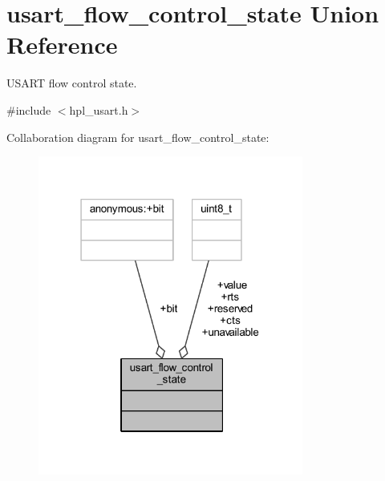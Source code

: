 \hypertarget{unionusart__flow__control__state}{}\section{usart\+\_\+flow\+\_\+control\+\_\+state Union Reference}
\label{unionusart__flow__control__state}


U\+S\+A\+RT flow control state.  




{\ttfamily \#include $<$hpl\+\_\+usart.\+h$>$}



Collaboration diagram for usart\+\_\+flow\+\_\+control\+\_\+state\+:
\nopagebreak
\begin{figure}[H]
\begin{center}
\leavevmode
\includegraphics[width=247pt]{unionusart__flow__control__state__coll__graph}
\end{center}
\end{figure}
